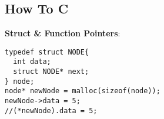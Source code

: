 \documentclass[a4paper,landscape]{article}
\newcommand{\rntopic}[1]{\vspace{-1.5em}\subsection*{#1}\vspace{-0.5em}}
\newcommand{\rnname}[1]{\textbf{#1}}
\begin{document}
\footnotesize
{}
\vspace*{-\baselineskip}\leavevmode
\vspace{-1.2cm}

\begin{multicols*}{4}

\raggedright

\rntopic{How To C}
\begin{flatitemize}
\vspace{0.3cm}
\item \rnname{Struct \& Function Pointers}: \\
\begin{lstlisting}
typedef struct NODE{
  int data;
  struct NODE* next;
} node;
node* newNode = malloc(sizeof(node));
newNode->data = 5;
//(*newNode).data = 5;


\end{lstlisting}
\end{flatitemize}
\end{multicols*}
\end{document}
